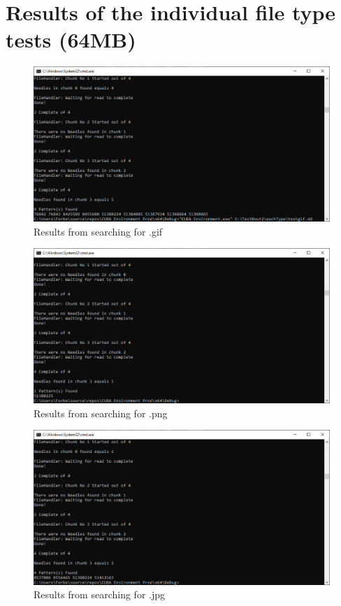 \section{Results of the individual file type tests (64MB)}
\label{sec:fileTypeTestApp}

\begin{figure}[!ht]
    \centering
    \includegraphics[width=\linewidth]{Images/Tests/64MB/GIFResult.png}
    \caption{Results from searching for .gif}
    \label{appItem:GIFsearch}
\end{figure}
\begin{figure}[!ht]
    \centering
    \includegraphics[width=\linewidth]{Images/Tests/64MB/PNGResults.png}
    \caption{Results from searching for .png}
    \label{appItem:PNGsearch}
\end{figure}
\newpage
\begin{figure}[!ht]
    \centering
    \includegraphics[width=\linewidth]{Images/Tests/64MB/JPGResults.png}
    \caption{Results from searching for .jpg}
    \label{appItem:JPGsearch}
\end{figure}
